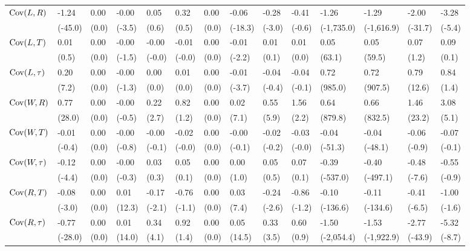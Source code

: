 {\begin{tabular}{@{}w{l}{6em}*{13}{w{c}{3em}}@{}}
    \quad $\mathrm{Cov}(L, R)$ & -1.24 & 0.00 & -0.00 & 0.05 & 0.32 & 0.00 & -0.06 & -0.28 & -0.41 & -1.26 & -1.29 & -2.00 & -3.28 \\
    & (-45.0) & (0.0) & (-3.5) & (0.6) & (0.5) & (0.0) & (-18.3) & (-3.0) & (-0.6) & (-1,735.0) & (-1,616.9) & (-31.7) & (-5.4) \\
    \quad $\mathrm{Cov}(L, T)$ & 0.01 & 0.00 & -0.00 & -0.00 & -0.01 & 0.00 & -0.01 & 0.01 & 0.01 & 0.05 & 0.05 & 0.07 & 0.09 \\
    & (0.5) & (0.0) & (-1.5) & (-0.0) & (-0.0) & (0.0) & (-2.2) & (0.1) & (0.0) & (63.1) & (59.5) & (1.2) & (0.1) \\
    \quad $\mathrm{Cov}(L, \tau)$ & 0.20 & 0.00 & -0.00 & 0.00 & 0.01 & 0.00 & -0.01 & -0.04 & -0.04 & 0.72 & 0.72 & 0.79 & 0.84 \\
    & (7.2) & (0.0) & (-1.3) & (0.0) & (0.0) & (0.0) & (-3.7) & (-0.4) & (-0.1) & (985.0) & (907.5) & (12.6) & (1.4) \\
    \quad $\mathrm{Cov}(W, R)$ & 0.77 & 0.00 & -0.00 & 0.22 & 0.82 & 0.00 & 0.02 & 0.55 & 1.56 & 0.64 & 0.66 & 1.46 & 3.08 \\
    & (28.0) & (0.0) & (-0.5) & (2.7) & (1.2) & (0.0) & (7.1) & (5.9) & (2.2) & (879.8) & (832.5) & (23.2) & (5.1) \\
    \quad $\mathrm{Cov}(W, T)$ & -0.01 & 0.00 & -0.00 & -0.00 & -0.02 & 0.00 & -0.00 & -0.02 & -0.03 & -0.04 & -0.04 & -0.06 & -0.07 \\
    & (-0.4) & (0.0) & (-0.8) & (-0.1) & (-0.0) & (0.0) & (-0.1) & (-0.2) & (-0.0) & (-51.3) & (-48.1) & (-0.9) & (-0.1) \\
    \quad $\mathrm{Cov}(W, \tau)$ & -0.12 & 0.00 & -0.00 & 0.03 & 0.05 & 0.00 & 0.00 & 0.05 & 0.07 & -0.39 & -0.40 & -0.48 & -0.55 \\
    & (-4.4) & (0.0) & (-0.3) & (0.3) & (0.1) & (0.0) & (1.0) & (0.5) & (0.1) & (-537.0) & (-497.1) & (-7.6) & (-0.9) \\
    \quad $\mathrm{Cov}(R, T)$ & -0.08 & 0.00 & 0.01 & -0.17 & -0.76 & 0.00 & 0.03 & -0.24 & -0.86 & -0.10 & -0.11 & -0.41 & -1.00 \\
    & (-3.0) & (0.0) & (12.3) & (-2.1) & (-1.1) & (0.0) & (7.4) & (-2.6) & (-1.2) & (-136.6) & (-134.6) & (-6.5) & (-1.6) \\
    \quad $\mathrm{Cov}(R, \tau)$ & -0.77 & 0.00 & 0.01 & 0.34 & 0.92 & 0.00 & 0.05 & 0.33 & 0.60 & -1.50 & -1.53 & -2.77 & -5.32 \\
    & (-28.0) & (0.0) & (14.0) & (4.1) & (1.4) & (0.0) & (14.5) & (3.5) & (0.9) & (-2,054.4) & (-1,922.9) & (-43.9) & (-8.7) \\

\end{tabular}}
